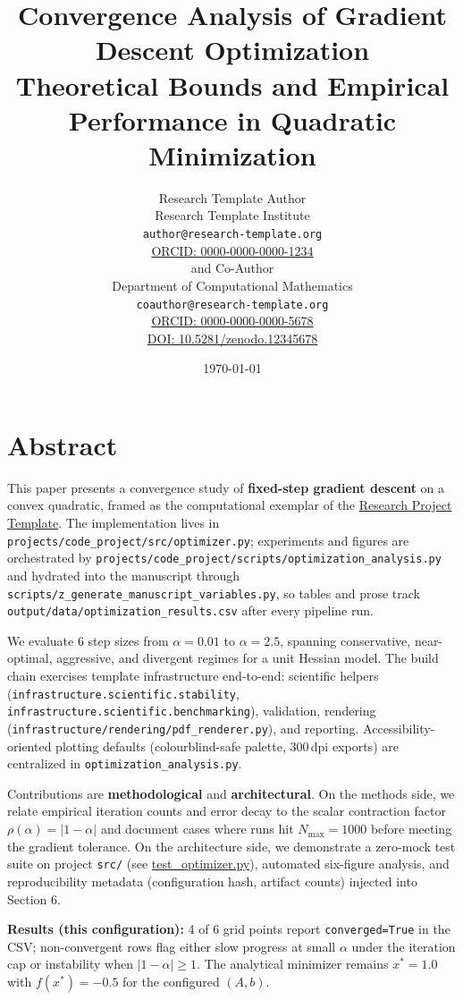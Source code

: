 \documentclass[
]{article}
\author{}
\date{}
\title{Convergence Analysis of Gradient Descent Optimization\\\normalsize Theoretical Bounds and Empirical Performance in Quadratic Minimization}
\author{Research Template Author\\\footnotesize{Research Template Institute}\\\footnotesize{\texttt{author@research-template.org}}\\\footnotesize{\href{https://orcid.org/0000-0000-0000-1234}{ORCID: 0000-0000-0000-1234}} \\and Co-Author\\\footnotesize{Department of Computational Mathematics}\\\footnotesize{\texttt{coauthor@research-template.org}}\\\footnotesize{\href{https://orcid.org/0000-0000-0000-5678}{ORCID: 0000-0000-0000-5678}} \\ \footnotesize{\href{https://doi.org/10.5281/zenodo.12345678}{DOI: 10.5281/zenodo.12345678}}}
\date{\today}
\begin{document}
\maketitle
\thispagestyle{empty}
\tableofcontents
\newpage


\section{Abstract}\label{abstract}

This paper presents a convergence study of \textbf{fixed-step gradient
descent} on a convex quadratic, framed as the computational exemplar of
the \href{https://github.com/docxology/template}{Research Project
Template}. The implementation lives in
\texttt{projects/code\_project/src/optimizer.py}; experiments and
figures are orchestrated by
\texttt{projects/code\_project/scripts/optimization\_analysis.py} and
hydrated into the manuscript through
\texttt{scripts/z\_generate\_manuscript\_variables.py}, so tables and
prose track \texttt{output/data/optimization\_results.csv} after every
pipeline run.

We evaluate 6 step sizes from \(\alpha = 0.01\) to \(\alpha = 2.5\),
spanning conservative, near-optimal, aggressive, and divergent regimes
for a unit Hessian model. The build chain exercises template
infrastructure end-to-end: scientific helpers
(\texttt{infrastructure.scientific.stability},
\texttt{infrastructure.scientific.benchmarking}), validation, rendering
(\texttt{infrastructure/rendering/pdf\_renderer.py}), and reporting.
Accessibility-oriented plotting defaults (colourblind-safe palette,
300\,dpi exports) are centralized in \texttt{optimization\_analysis.py}.

Contributions are \textbf{methodological} and \textbf{architectural}. On
the methods side, we relate empirical iteration counts and error decay
to the scalar contraction factor \(\rho(\alpha) = |1-\alpha|\) and
document cases where runs hit \(N_{\max} = 1000\) before meeting the
gradient tolerance. On the architecture side, we demonstrate a zero-mock
test suite on project \texttt{src/} (see
\href{https://github.com/docxology/template/blob/main/projects/code_project/tests/test_optimizer.py}{test\_optimizer.py}),
automated six-figure analysis, and reproducibility metadata
(configuration hash, artifact counts) injected into Section 6.

\textbf{Results (this configuration):} 4 of 6 grid points report
\texttt{converged=True} in the CSV; non-convergent rows flag either slow
progress at small \(\alpha\) under the iteration cap or instability when
\(|1-\alpha| \geq 1\). The analytical minimizer remains \(x^\ast = 1.0\)
with \(f(x^\ast) = -0.5\) for the configured \((A,b)\).
\end{document}
